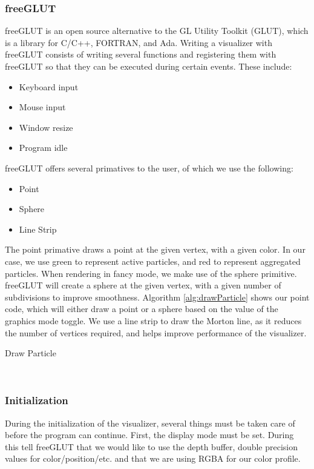 \documentclass[fleqn,10pt]{UserGuideArx} %
\begin{document}
\subsubsection{freeGLUT}
freeGLUT is an open source alternative to the GL Utility Toolkit (GLUT), which is a library for C/C++, FORTRAN, and Ada. Writing a visualizer with freeGLUT consists of writing several functions and registering them with freeGLUT so that they can be executed during certain events. These include:
\begin{itemize}
    \item Keyboard input
    \item Mouse input
    \item Window resize
    \item Program idle
\end{itemize}
freeGLUT offers several primatives to the user, of which we use the following:
\begin{itemize}
    \item Point
    \item Sphere
    \item Line Strip
\end{itemize}
The point primative draws a point at the given vertex, with a given color. In our case, we use green to represent active particles, and red to represent aggregated particles. When rendering in fancy mode, we make use of the sphere primitive. freeGLUT will create a sphere at the given vertex, with a given number of subdivisions to improve smoothness. Algorithm \ref{alg:drawParticle} shows our point code, which will either draw a point or a sphere based on the value of the graphics mode toggle. We use a line strip to draw the Morton line, as it reduces the number of vertices required, and helps improve performance of the visualizer.
\begin{algorithm}
    \caption{Draw Particle}\label{alg:drawParticle}
\end{algorithm}
~\\
\subsubsection{Initialization}
    During the initialization of the visualizer, several things must be taken care of before the program can continue. First, the display mode must be set. During this tell freeGLUT that we would like to use the depth buffer, double precision values for color/position/etc. and that we are using RGBA for our color profile.\\
\end{document}
